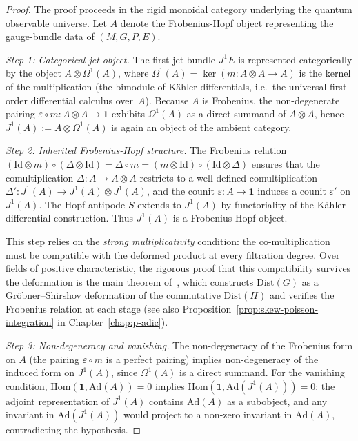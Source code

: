 \begin{proof}
The proof proceeds in the rigid monoidal category underlying the quantum
observable universe.  Let $A$ denote the Frobenius-Hopf object
representing the gauge-bundle data of $(M,G,P,E)$.

\emph{Step 1: Categorical jet object.}\;
The first jet bundle $J^1 E$ is represented categorically by the object
$A \otimes \Omega^1(A)$, where
$\Omega^1(A) = \ker(m\colon A\otimes A \to A)$
is the kernel of the multiplication (the bimodule of K\"ahler
differentials, i.e.\ the universal first-order differential calculus
over~$A$).
Because $A$ is Frobenius, the non-degenerate pairing
$\varepsilon \circ m \colon A \otimes A \to \mathbf{1}$ exhibits
$\Omega^1(A)$ as a direct summand of $A \otimes A$, hence
$J^1(A) := A \otimes \Omega^1(A)$ is again an object of the ambient
category.

\emph{Step 2: Inherited Frobenius-Hopf structure.}\;
The Frobenius relation
$(\mathrm{Id} \otimes m) \circ (\Delta \otimes \mathrm{Id})
 = \Delta \circ m
 = (m \otimes \mathrm{Id}) \circ (\mathrm{Id} \otimes \Delta)$
ensures that the comultiplication $\Delta\colon A \to A \otimes A$ restricts
to a well-defined comultiplication
$\Delta'\colon J^1(A) \to J^1(A) \otimes J^1(A)$, and the counit
$\varepsilon\colon A \to \mathbf{1}$ induces a counit $\varepsilon'$ on
$J^1(A)$.  The Hopf antipode $S$ extends to $J^1(A)$ by functoriality of the
K\"ahler differential construction.  Thus $J^1(A)$ is a Frobenius-Hopf object.

This step relies on the \emph{strong multiplicativity} condition: the
co-multiplication must be compatible with the deformed product at every
filtration degree.  Over fields of positive characteristic, the
rigorous proof that this compatibility survives the deformation is the
main theorem of~\cite{fred2005}, which constructs $\mathrm{Dist}(G)$
as a Gr\"obner--Shirshov deformation of the commutative
$\mathrm{Dist}(H)$ and verifies the Frobenius relation at each stage
(see also Proposition~\ref{prop:skew-poisson-integration} in
Chapter~\ref{chap:p-adic}).

\emph{Step 3: Non-degeneracy and vanishing.}\;
The non-degeneracy of the Frobenius form on $A$ (the pairing
$\varepsilon \circ m$ is a perfect pairing) implies non-degeneracy of the
induced form on $J^1(A)$, since $\Omega^1(A)$ is a direct summand.
For the vanishing condition, $\mathrm{Hom}(\mathbf{1}, \mathrm{Ad}(A)) = 0$
implies $\mathrm{Hom}(\mathbf{1}, \mathrm{Ad}(J^1(A))) = 0$: the adjoint
representation of $J^1(A)$ contains $\mathrm{Ad}(A)$ as a subobject, and any
invariant in $\mathrm{Ad}(J^1(A))$ would project to a non-zero invariant in
$\mathrm{Ad}(A)$, contradicting the hypothesis.


\end{proof}
